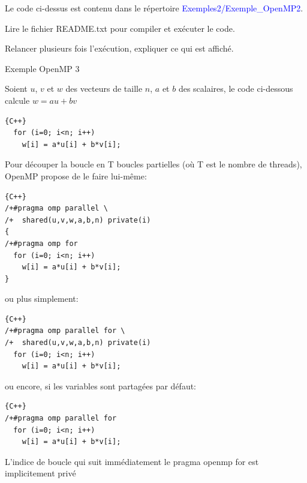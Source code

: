 \documentclass{beamer}
\begin{document}
\begin{frame}
	Le code ci-dessus est contenu dans le répertoire \textcolor{blue}{Exemples2/Exemple\_OpenMP2}.
	
	Lire le fichier README.txt pour compiler et exécuter le code.
	
	\bigskip
	Relancer plusieurs fois l'exécution, expliquer ce qui est affiché.
	
\end{frame}

\begin{frame}[fragile]
Exemple OpenMP 3

    \vfill	
    
	Soient $u$, $v$ et $w$ des vecteurs de taille $n$, $a$ et $b$ des scalaires, le code ci-dessous calcule $w = a u + b v$

\vspace{-0.1cm}
\begin{lstlisting}{C++}
  for (i=0; i<n; i++)
    w[i] = a*u[i] + b*v[i];
\end{lstlisting}
\vfill

Pour découper la boucle en T boucles partielles (où T est le nombre de threads), OpenMP propose de le faire lui-même:


\begin{lstlisting}{C++}
/+#pragma omp parallel \
/+  shared(u,v,w,a,b,n) private(i)
{
/+#pragma omp for
  for (i=0; i<n; i++)
    w[i] = a*u[i] + b*v[i];
}
\end{lstlisting}

\end{frame}

\begin{frame}[fragile]
ou plus simplement:

\begin{lstlisting}{C++}
/+#pragma omp parallel for \
/+  shared(u,v,w,a,b,n) private(i)
  for (i=0; i<n; i++)
    w[i] = a*u[i] + b*v[i];
\end{lstlisting}

ou encore, si les variables sont partagées par défaut:
\begin{lstlisting}{C++}
/+#pragma omp parallel for
  for (i=0; i<n; i++)
    w[i] = a*u[i] + b*v[i];
\end{lstlisting}

L'indice de boucle qui suit immédiatement le pragma openmp for est implicitement privé
\end{frame}
\end{document}
